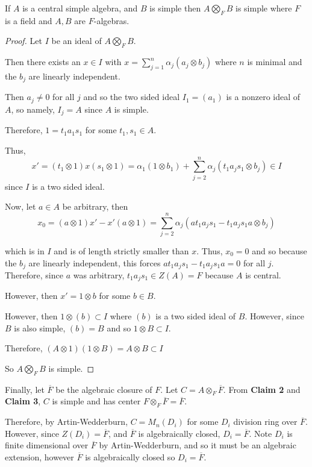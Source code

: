 \documentclass[12pt]{AlgebraQual}
\begin{document}
\begin{solution}
\begin{enumerate}[label=(\alph*)]
    \begin{claim} If $A$ is a central simple algebra, and $B$ is simple then $A\bigotimes_F B$ is simple where $F$ is a field and $A,B$ are $F$-algebras.
    \begin{proof} Let $I$ be an ideal of $A\bigotimes_F B$.

    Then there exists an $x\in I$ with $x=\sum_{j=1}^n\alpha_j(a_j\otimes b_j)$ where $n$ is minimal and the $b_j$ are linearly independent.

    Then $a_j\not=0$ for all $j$ and so the two sided ideal $I_1=(a_1)$ is a nonzero ideal of $A$, so namely, $I_j=A$ since $A$ is simple.

    Therefore, $1=t_1a_1s_1$ for some $t_1,s_1\in A$.

    Thus, $$x'=(t_1\otimes 1)x(s_1\otimes 1)=\alpha_1(1\otimes b_1)+\sum_{j=2}^n\alpha_j(t_1a_js_1\otimes b_j)\in I$$ since $I$ is a two sided ideal.

    Now, let $a\in A$ be arbitrary, then $$x_0=(a\otimes 1)x'-x'(a\otimes 1)=\sum_{j=2}^n\alpha_j(at_1a_js_1-t_1a_js_1a\otimes b_j)$$

    which is in $I$ and is of length strictly smaller than $x$. Thus, $x_0=0$ and so because the $b_j$ are linearly independent, this forces $at_1a_js_1-t_1a_js_1a=0$ for all $j.$ Therefore, since $a$ was arbitrary, $t_1a_js_1\in Z(A)=F$ because $A$ is central.

    However, then $x'=1\otimes b$ for some $b\in B$.

    However, then $1\otimes (b)\subset I$ where $(b)$ is a two sided ideal of $B.$ However, since $B$ is also simple, $(b)=B$ and so $1\otimes B\subset I$.

    Therefore, $(A\otimes 1)(1\otimes B)=A\otimes B\subset I$

    So $A\bigotimes_F B$ is simple.
    \end{proof}
    \end{claim}

    Finally, let $\overline{F}$ be the algebraic closure of $F.$ Let $C=A\otimes_F\overline{F}$. From \textbf{Claim 2} and \textbf{Claim 3}, $C$ is simple and has center $F\otimes_F\overline{F}=\overline{F}.$

    Therefore, by Artin-Wedderburn, $C= M_n(D_i)$ for some $D_i$ division ring over $\overline{F}$. However, since $Z(D_i)=\overline{F}$, and $\overline{F}$ is algebraically closed, $D_i=\overline{F}$. Note $D_i$ is finite dimensional over $\overline{F}$ by Artin-Wedderburn, and so it must be an algebraic extension, however $\overline{F}$ is algebraically closed so $D_i=\overline{F}.$


\end{enumerate}
\end{solution}
\end{document}
